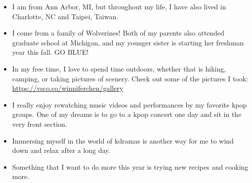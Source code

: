 \documentclass[
]{book}
\providecommand{\tightlist}{%
  \setlength{\itemsep}{0pt}\setlength{\parskip}{0pt}}
\begin{document}
\begin{itemize}
\tightlist
\item
  I am from Ann Arbor, MI, but throughout my life, I have also lived in Charlotte, NC and Taipei, Taiwan.
\item
  I come from a family of Wolverines! Both of my parents also attended graduate school at Michigan, and my younger sister is starting her freshman year this fall. GO BLUE!
\item
  In my free time, I love to spend time outdoors, whether that is hiking, camping, or taking pictures of scenery. Check out some of the pictures I took: \url{https://vsco.co/winniferchen/gallery}
\item
  I really enjoy rewatching music videos and performances by my favorite kpop groups. One of my dreams is to go to a kpop concert one day and sit in the very front section.
\item
  Immersing myself in the world of kdramas is another way for me to wind down and relax after a long day.
\item
  Something that I want to do more this year is trying new recipes and cooking more.
\end{itemize}
\end{document}
